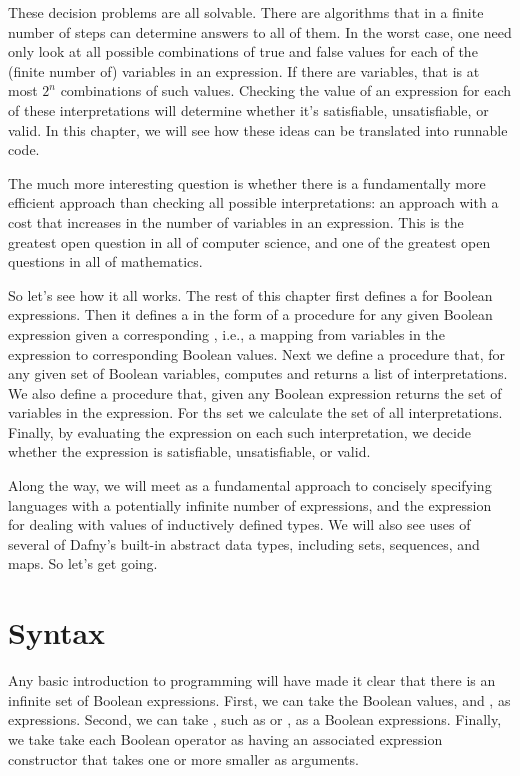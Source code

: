\documentclass[letterpaper,10pt,english]{sphinxmanual}
\begin{document}
These decision problems are all solvable. There are algorithms that in
a finite number of steps can determine answers to all of them. In the
worst case, one need only look at all possible combinations of true
and false values for each of the (finite number of) variables in an
expression. If there are  variables, that is at most \(2^n\)
combinations of such values. Checking the value of an expression for
each of these interpretations will determine whether it’s satisfiable,
unsatisfiable, or valid. In this chapter, we will see how these ideas
can be translated into runnable code.

The much more interesting question is whether there is a fundamentally
more efficient approach than checking all possible interpretations: an
approach with a cost that increases  in the number of
variables in an expression. This is the greatest open question in all
of computer science, and one of the greatest open questions in all of
mathematics.

So let’s see how it all works. The rest of this chapter first defines
a  for Boolean expressions. Then it defines a  in
the form of a procedure for  any given Boolean expression
given a corresponding , i.e., a mapping from variables
in the expression to corresponding Boolean values. Next we define a
procedure that, for any given set of Boolean variables, computes and
returns a list of  interpretations. We also define a procedure
that, given any Boolean expression returns the set of variables in the
expression. For ths set we calculate the set of all interpretations.
Finally, by evaluating the expression on each such interpretation, we
decide whether the expression is satisfiable, unsatisfiable, or valid.

Along the way, we will meet  as a fundamental
approach to concisely specifying languages with a potentially infinite
number of expressions, and the  expression for dealing with
values of inductively defined types. We will also see uses of several
of Dafny’s built-in abstract data types, including sets, sequences,
and maps. So let’s get going.


\section{Syntax}
\label{\detokenize{08-propositional-logic:syntax}}
Any basic introduction to programming will have made it clear that
there is an infinite set of Boolean expressions. First, we can take
the Boolean values,  and , as  expressions.
Second, we can take , such as  or , as a
Boolean  expressions. Finally, we take take each Boolean
operator as having an associated expression constructor that takes one
or more smaller  as arguments.
\end{document}
